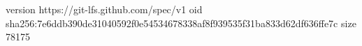 version https://git-lfs.github.com/spec/v1
oid sha256:7e6ddb390de31040592f0e54534678338af8f939535f31ba833d62df636ffe7c
size 78175
